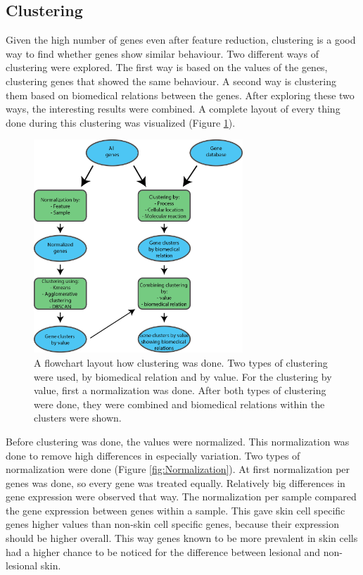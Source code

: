 \documentclass[10pt,a4paper]{report}
\begin{document}
	\subsection{Clustering}
	\label{subsec:MethodsPositionalClustering}
	
	Given the high number of genes even after feature reduction, clustering is a good way to find whether genes show similar behaviour. Two different ways of clustering were explored. The first way is based on the values of the genes, clustering genes that showed the same behaviour. A second way is clustering them based on biomedical relations between the genes. After exploring these two ways, the interesting results were combined. A complete layout of every thing done during this clustering was visualized (Figure \ref{fig:ClusteringLayout}).
	
	\begin{figure}[H]
		\includegraphics[width=0.7\textwidth]{ClusteringLayout.png}
		\caption{A flowchart layout how clustering was done. Two types of clustering were used, by biomedical relation and by value. For the clustering by value, first a normalization was done. After both types of clustering were done, they were combined and biomedical relations within the clusters were shown.}
		\label{fig:ClusteringLayout}
	\end{figure}
	
	Before clustering was done, the values were normalized. This normalization was done to remove high differences in especially variation. Two types of normalization were done (Figure \ref{fig:Normalization}). At first normalization per genes was done, so every gene was treated equally. Relatively big differences in gene expression were observed that way. The normalization per sample compared the gene expression between genes within a sample. This gave skin cell specific genes higher values than non-skin cell specific genes, because their expression should be higher overall. This way genes known to be more prevalent in skin cells had a higher chance to be noticed for the difference between lesional and non-lesional skin.
	
\end{document}
